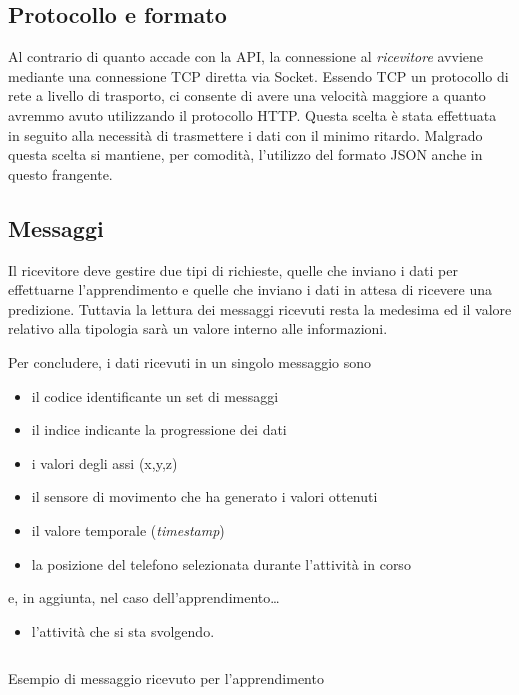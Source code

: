 \subsection{Protocollo e formato}
Al contrario di quanto accade con la API, la connessione al \textit{ricevitore} avviene mediante una connessione 
TCP diretta via Socket.
Essendo TCP un protocollo di rete a livello di trasporto, ci consente di avere una velocità maggiore a quanto avremmo avuto 
utilizzando il protocollo HTTP. Questa scelta è stata effettuata in seguito alla necessità di trasmettere i dati
con il minimo ritardo.
Malgrado questa scelta si mantiene, per comodità, l'utilizzo del formato JSON anche in questo frangente.


\subsection{Messaggi}
Il ricevitore deve gestire due tipi di richieste, quelle che inviano i dati per effettuarne l'apprendimento e quelle che inviano
i dati in attesa di ricevere una predizione. Tuttavia la lettura dei messaggi ricevuti resta la medesima ed il 
valore relativo alla tipologia sarà un valore interno alle informazioni.

Per concludere, i dati ricevuti in un singolo messaggio sono
\begin{itemize}
    \item il codice identificante un set di messaggi
    \item il indice indicante la progressione dei dati
    \item i valori degli assi (x,y,z)
    \item il sensore di movimento che ha generato i valori ottenuti
    \item il valore temporale (\textit{timestamp})
    \item la posizione del telefono selezionata durante l'attività in corso
\end{itemize}
e, in aggiunta, nel caso dell'apprendimento\dots
\begin{itemize}
    \item l'attività che si sta svolgendo.
\end{itemize}

\begin{listing}[H] 
    \inputminted[frame=single,framesep=10pt]{json}{assets/snippets/server/receiver/message.json}
    \caption{Esempio di messaggio ricevuto per l'apprendimento}
    \label{code:example-message-learning}
\end{listing}

